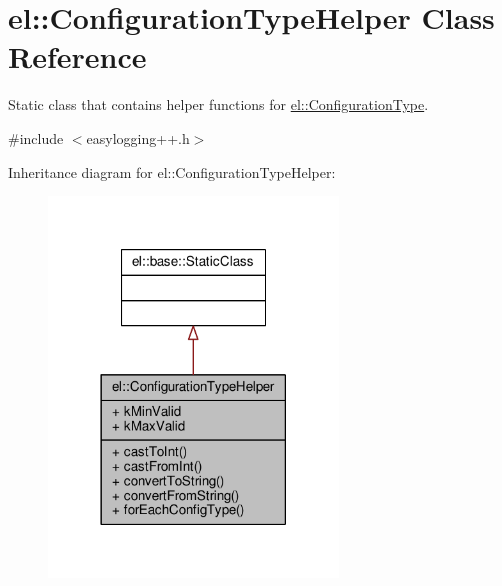 \hypertarget{classel_1_1ConfigurationTypeHelper}{}\section{el\+:\+:Configuration\+Type\+Helper Class Reference}
\label{classel_1_1ConfigurationTypeHelper}


Static class that contains helper functions for \hyperlink{namespaceel_a281f5db6d6163678bc68a8b23b59e124}{el\+::\+Configuration\+Type}.  




{\ttfamily \#include $<$easylogging++.\+h$>$}



Inheritance diagram for el\+:\+:Configuration\+Type\+Helper\+:
\nopagebreak
\begin{figure}[H]
\begin{center}
\leavevmode
\includegraphics[width=218pt]{d5/d27/classel_1_1ConfigurationTypeHelper__inherit__graph}
\end{center}
\end{figure}


